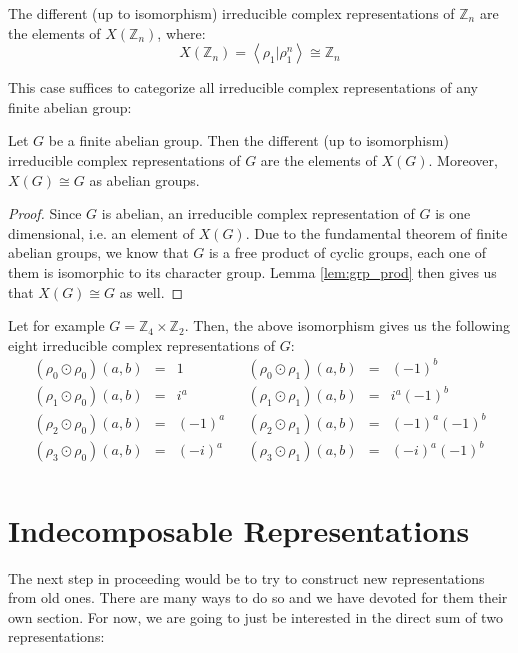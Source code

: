 \begin{lemma} The different (up to isomorphism) irreducible complex representations of $\mathbb{Z}_n$ are the elements of $X(\mathbb{Z}_n)$, where:
$$X(\mathbb{Z}_n)=\left<\rho_1|\rho_1^n\right>\cong\mathbb{Z}_n$$
\end{lemma}

This case suffices to categorize all irreducible complex representations of any finite abelian group:

\begin{proposition} Let $G$ be a finite abelian group. Then the different (up to isomorphism) irreducible complex representations of $G$ are the elements of $X(G)$. Moreover, $X(G)\cong G$ as abelian groups.
\end{proposition}
\begin{proof} Since $G$ is abelian, an irreducible complex representation of $G$ is one dimensional, i.e. an element of $X(G)$. Due to the fundamental theorem of finite abelian groups, we know that $G$ is a free product of cyclic groups, each one of them is isomorphic to its character group. Lemma \ref{lem:grp_prod} then gives us that $X(G)\cong G$ as well.
\end{proof}

\begin{example} Let for example $G=\mathbb{Z}_4\times\mathbb{Z}_2$. Then, the above isomorphism gives us the following eight irreducible complex representations of $G$:
$$\begin{array}{lclclcl}
(\rho_0\odot\rho_0)(a,b)&=&1&&(\rho_0\odot\rho_1)(a,b)&=&(-1)^b\\
(\rho_1\odot\rho_0)(a,b)&=&i^a&&(\rho_1\odot\rho_1)(a,b)&=&i^a(-1)^b\\
(\rho_2\odot\rho_0)(a,b)&=&(-1)^a&&(\rho_2\odot\rho_1)(a,b)&=&(-1)^a(-1)^b\\
(\rho_3\odot\rho_0)(a,b)&=&(-i)^a&&(\rho_3\odot\rho_1)(a,b)&=&(-i)^a(-1)^b\\
\end{array}$$
\end{example}

\section{Indecomposable Representations}

The next step in proceeding would be to try to construct new representations from old ones. There are many ways to do so and we have devoted for them their own section. For now, we are going to just be interested in the direct sum of two representations:

